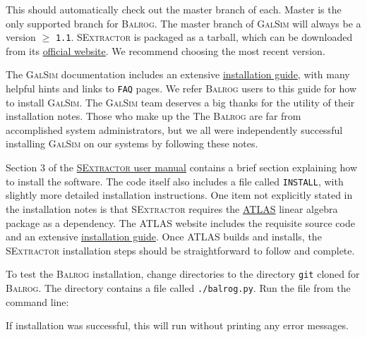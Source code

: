 \documentclass[11pt]{book}
\newcommand{\codett}[1]{\lstinline{#1}}
\newcommand{\galsim}{\textsc{GalSim}}
\newcommand{\balrog}{\textsc{Balrog}}
\newcommand{\sex}{\textsc{SExtractor}}
\begin{document}
\begin{cmdline}
\end{cmdline}

\noindent This should automatically check out the master branch of each.
Master is the only supported branch for \balrog{}. 
The master branch of \galsim{} will always be a version $\geq$ \codett{1.1}.
\sex{} is packaged as a tarball, which can be downloaded 
from its \href{https://www.astromatic.net/software/sextractor}{official website}.
We recommend choosing the most recent version.

The \galsim{} documentation includes an extensive
\href{https://github.com/GalSim-developers/GalSim/blob/releases/1.0/INSTALL.md}{installation guide},
with many helpful hints and links to \codett{FAQ} pages. 
We refer \balrog{} users to this guide for how to install \galsim{}.
The \galsim{} team deserves a big thanks for the utility of their installation notes.
Those who make up the The \balrog{} are far from accomplished system administrators, 
but we all were independently successful installing \galsim{} on our systems by following these notes.

Section 3 of the \href{https://www.astromatic.net/pubsvn/software/sextractor/trunk/doc/sextractor.pdf}{\sex{} user manual}
contains a brief section explaining how to install the software. The code itself also includes a file called \codett{INSTALL}, with
slightly more detailed installation instructions.
One item not explicitly stated in the installation notes is that \sex{} requires the \href{http://math-atlas.sourceforge.net/}{ATLAS}
linear algebra package as a dependency.
The ATLAS website includes the requisite source code and
an extensive \href{http://math-atlas.sourceforge.net/atlas_install/}{installation guide}.
Once ATLAS builds and installs, the \sex{} installation steps should be straightforward to follow and complete.

To test the \balrog{} installation, change directories to the directory \codett{git} cloned for \balrog{}.
The directory contains a file called \codett{./balrog.py}. Run the file from the command line:

\begin{cmdline}
\end{cmdline}

\noindent If installation was successful, this will run without printing any error messages.
\end{document}
